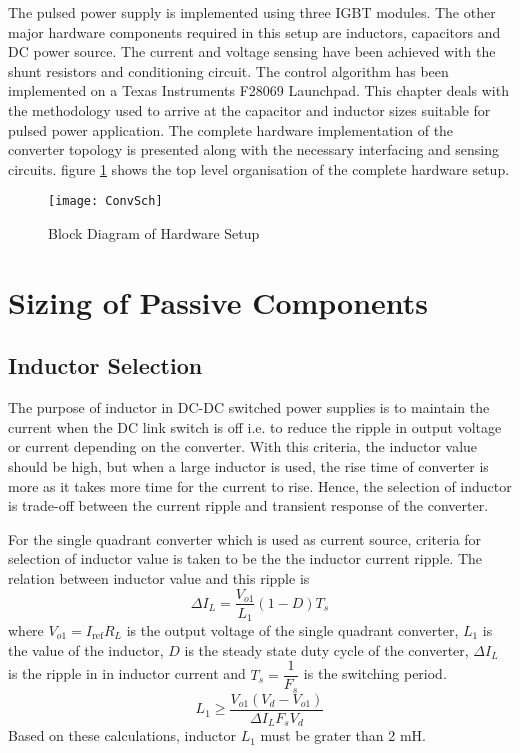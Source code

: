 \label{chap:hardware}
    The pulsed power supply is implemented using three IGBT modules. The other major hardware components required in this setup are inductors, capacitors and DC power source. The current and voltage sensing have been achieved with the shunt resistors and conditioning circuit. The control algorithm has been implemented on a Texas Instruments F28069 Launchpad. This chapter deals with the methodology used to arrive at the capacitor and inductor sizes suitable for pulsed power application. The complete hardware implementation of the converter topology is presented along with the necessary interfacing and sensing circuits.
	figure \ref{fig:block-diag} shows the top level organisation of the complete hardware setup.
    \begin{figure}[h]
        \centering
        \texttt{[image: ConvSch]}
        \caption{Block Diagram of Hardware Setup}
        \label{fig:block-diag}
    \end{figure}

\section{Sizing of Passive Components}
\subsection{Inductor Selection}
	The purpose of inductor in DC-DC switched power supplies is to maintain the current when the DC link switch is off i.e. to reduce the ripple in output voltage or current depending on the converter. With this criteria, the inductor value should be high, but when a large inductor is used, the rise time of converter is more as it takes more time for the current to rise. Hence, the selection of inductor is trade-off between the current ripple and transient response of the converter. 

	For the single quadrant converter which is used as current source, criteria for selection of inductor value is taken to be the the inductor current ripple. The relation between inductor value and this ripple \cite{book:768263} is 
	\begin{equation}
		\Delta I_L = \dfrac{V_{o1}}{L_1} (1-D) T_s
		\label{eq:ind-1}
	\end{equation}
	where $V_{o1} = I_{\text{ref}} R_L$ is the output voltage of the single quadrant converter, $L_1$ is the value of the inductor, $D$ is the steady state duty cycle of the converter, $\Delta I_L$ is the ripple in in inductor current and $T_s = \dfrac{1}{F_s}$ is the switching period.
	\begin{equation}
		L_1 \geq \dfrac{V_{o1}(V_d-V_{o1})}{\Delta I_L F_s V_d}
		\label{eq:ind-1a}
	\end{equation}
	Based on these calculations, inductor $L_1$ must be grater than 2 mH. 


